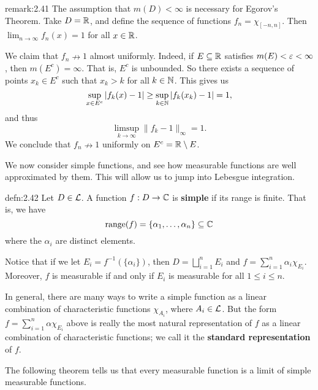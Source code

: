 \begin{remark}{remark:2.41}
    The assumption that $m(D) < \infty$ is necessary for Egorov's Theorem. 
    Take $D = \mathbb{R}$, and define the sequence of functions $f_n = \chi_{[-n, n]}$. 
    Then $\lim_{n\to\infty} f_n(x) = 1$ for all $x \in \mathbb{R}$. 

    We claim that $f_n \nrightarrow 1$ almost uniformly. Indeed, if 
    $E \subseteq \mathbb{R}$ satisfies $m(E) < \varepsilon < \infty$, then $m(E^c) = \infty$. 
    That is, $E^c$ is unbounded. So there exists a sequence of points 
    $x_k \in E^c$ such that $x_k > k$ for all $k \in \mathbb{N}$. This gives us 
    \[ \sup_{x\in E^c} |f_k(x) - 1| \geq \sup_{k\in\mathbb{N}} |f_k(x_k) - 1| = 1, \] 
    and thus 
    \[ \limsup_{k\to\infty} \|f_k - 1\|_\infty = 1. \] 
    We conclude that $f_n \nrightarrow 1$ uniformly on $E^c = \mathbb{R} \setminus E$.
\end{remark}

We now consider simple functions, and see how measurable functions are 
well approximated by them. This will allow us to jump into Lebesgue integration.

\begin{defn}{defn:2.42}
    Let $D \in {\cal L}$. A function $f : D \to \mathbb{C}$ is {\bf simple} if 
    its range is finite. That is, we have 
    \[ \text{range}(f) = \{\alpha_1, \dots, \alpha_n\} \subseteq \mathbb{C} \] 
    where the $\alpha_i$ are distinct elements. 
\end{defn}

Notice that if we let $E_i = f^{-1}(\{\alpha_i\})$, then $D = 
\bigsqcup_{i=1}^n E_i$ and $f = \sum_{i=1}^n \alpha_i \chi_{E_i}$. 
Moreover, $f$ is measurable if and only if $E_i$ is measurable for all 
$1 \leq i \leq n$. 

In general, there are many ways to write a simple function as a linear 
combination of characteristic functions $\chi_{A_i}$, where $A_i \in 
{\cal L}$. But the form $f = \sum_{i=1}^n \alpha \chi_{E_i}$ above is really the 
most natural representation of $f$ as a linear combination of 
characteristic functions; we call it the {\bf standard representation} of $f$. 

The following theorem tells us that every measurable function is a limit 
of simple measurable functions. 

